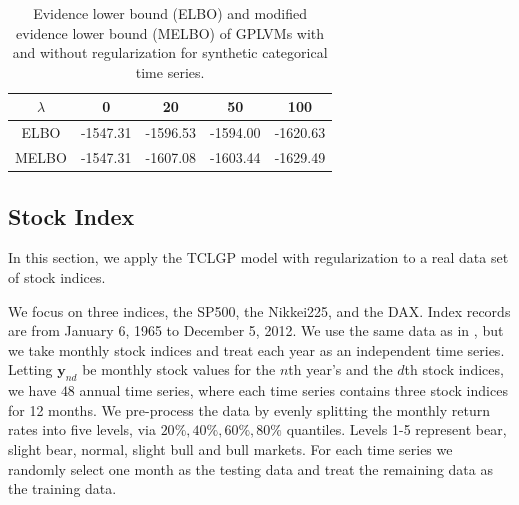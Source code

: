\documentclass{article}
\begin{document}
\begin{table}[ht!]
	\centering
	\begin{tabular}{|c|c|c|c|c|}
		\hline
		$\lambda$ & 0 & 20 & 50 & 100 \\
		\hline
		ELBO & -1547.31  & -1596.53 & -1594.00 & -1620.63 \\
		\hline
		MELBO & -1547.31 & -1607.08 & -1603.44 & -1629.49 \\
		\hline
	\end{tabular}
	\caption{Evidence lower bound (ELBO) and modified evidence lower bound (MELBO) of GPLVMs with and without regularization for synthetic categorical time series.}
	\label{tab:SIM}
\end{table}

\subsection{Stock Index}
In this section, we apply the TCLGP model with regularization to a real data set of stock indices.

We focus on three indices, the SP500, the Nikkei225, and the DAX. Index records are from January 6, 1965 to December 5, 2012. We use the same data as in \cite{Joao_2014}, but we take monthly stock indices and treat each year as an independent time series. Letting $\bm y_{nd}$ be monthly stock values for the $n$th year's and the $d$th stock indices, we have $48$ annual time series, where each time series contains three stock indices for 12 months. We pre-process the data by evenly splitting the monthly return rates into five levels, via $20\%, 40\%, 60\%, 80\%$ quantiles.
%
Levels 1-5 represent bear, slight bear, normal, slight bull and bull markets. For each time series we randomly select one month as the testing data and treat the remaining data as the training data.

\end{document}
